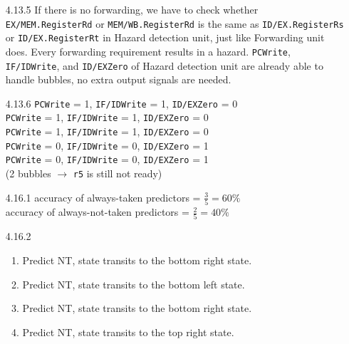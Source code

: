 \documentclass[12pt, a4paper]{article}
\begin{document}
\begin{itemize}[font=\bfseries]
 \\
 \\ (\texttt{lw r3, 4(r5)} forwarding \texttt{r5} from \texttt{add r5, r2, r1}) \\
 \\
\item[4.13.5] 
If there is no forwarding, we have to check whether \texttt{EX/MEM.RegisterRd} or \texttt{MEM/WB.RegisterRd} is the same as \texttt{ID/EX.RegisterRs} or \texttt{ID/EX.RegisterRt} in Hazard detection unit, just like Forwarding unit does. Every forwarding requirement results in a hazard. \texttt{PCWrite}, \texttt{IF/IDWrite}, and \texttt{ID/EXZero} of Hazard detection unit are already able to handle bubbles, no extra output signals are needed.
\item[4.13.6]
\texttt{PCWrite} = 1, \texttt{IF/IDWrite} = 1, \texttt{ID/EXZero} = 0 \\
\texttt{PCWrite} = 1, \texttt{IF/IDWrite} = 1, \texttt{ID/EXZero} = 0 \\
\texttt{PCWrite} = 1, \texttt{IF/IDWrite} = 1, \texttt{ID/EXZero} = 0 \\
\texttt{PCWrite} = 0, \texttt{IF/IDWrite} = 0, \texttt{ID/EXZero} = 1 \\
\texttt{PCWrite} = 0, \texttt{IF/IDWrite} = 0, \texttt{ID/EXZero} = 1 \\
(2 bubbles $\rightarrow$ \texttt{r5} is still not ready)
\item[4.16.1]
accuracy of always-taken predictors = $\displaystyle \frac{3}{5} = 60\%$ \\
accuracy of always-not-taken predictors = $\displaystyle \frac{2}{5} = 40\%$ 
\item[4.16.2]
\begin{enumerate}[(1)]
\item Predict NT, state transits to the bottom right state.
\item Predict NT, state transits to the bottom left state.
\item Predict NT, state transits to the bottom right state.
\item Predict NT, state transits to the top right state.

\end{enumerate}
\end{itemize}
\end{document}
